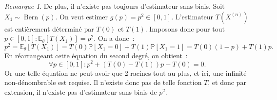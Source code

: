 \documentclass{report}
\DeclareMathOperator{\Bern}{Bern}  %
\renewcommand{\P}{\mathbb P}
\newcommand{\E}{\mathbb E}
\theoremstyle{definition}
\theoremstyle{remark}
\newtheorem*{rmq}{Remarque}
\begin{document}
		\begin{rmq} De plus, il n'existe pas toujours d'estimateur sans biais. Soit $X_1 \sim \Bern(p)$. On veut estimer $g(p) = p^2 \in [0, 1]$. L'estimateur
		$T(X^{(n)})$ est entièrement déterminé par $T(0)$ et $T(1)$. Imposons donc pour tout $p \in [0, 1] : \E_\theta[T(X_1)] = p^2$. On a donc~:
		\[p^2 = \E_\theta[T(X_1)] = T(0)\P[X_1 = 0] + T(1)\P[X_1 = 1] = T(0)(1-p) + T(1)p.\]
		En réarrangeant cette équation du second degré, on obtient~:
		\[\forall p \in [0, 1] : p^2 + (T(0) - T(1))p - T(0) = 0.\]
		Or une telle équation ne peut avoir que 2 racines tout au plus, et ici, une infinité non-dénombrable est requise. Il n'existe donc pas de telle fonction $T$,
		et donc par extension, il n'existe pas d'estimateur sans biais de $p^2$.
		\end{rmq}
\end{document}
